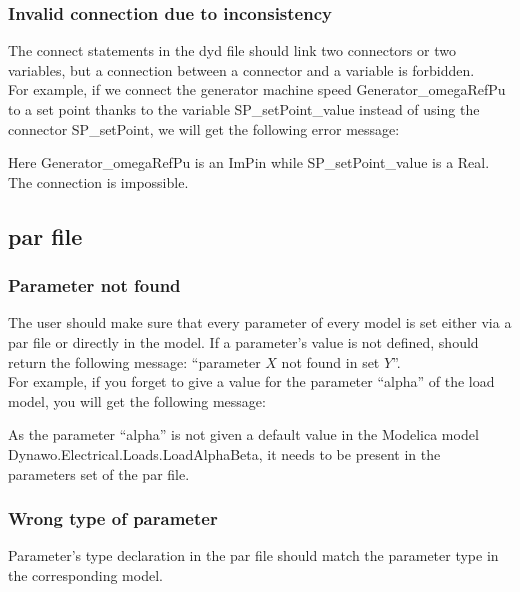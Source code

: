 \documentclass[a4paper, 12pt]{report}
\begin{document}
\subsubsection{Invalid connection due to inconsistency}

The connect statements in the dyd file should link two connectors or two variables, but a connection between a connector and a variable is forbidden. \\

For example, if we connect the generator machine speed Generator\_omegaRefPu to a set point thanks to the variable SP\_setPoint\_value instead of using the connector SP\_setPoint, we will get the following error message:



Here Generator\_omegaRefPu is an ImPin while SP\_setPoint\_value is a Real. The connection is impossible.

\subsection{par file}

\subsubsection{Parameter not found}

The user should make sure that every parameter of every model is set either via a par file or directly in the model. If a parameter's value is not defined, \Dynawo should return the following message: ``parameter $X$ not found in set $Y$''. \\

For example, if you forget to give a value for the parameter ``alpha'' of the load model, you will get the following message:


As the parameter ``alpha'' is not given a default value in the Modelica model Dynawo.Electrical.Loads.LoadAlphaBeta, it needs to be present in the parameters set of the par file.

\subsubsection{Wrong type of parameter}

Parameter's type declaration in the par file should match the parameter type in the corresponding model. \\
\end{document}
